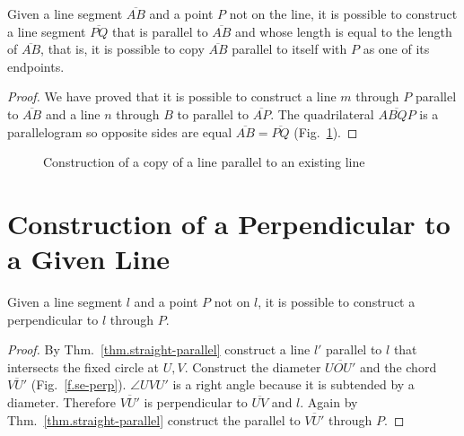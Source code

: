 \begin{theorem}\label{thm.parallel-equal}
Given a line segment $\overline{AB}$ and a point $P$ not on the line, it is possible to construct a line segment $\overline{PQ}$ that is parallel to $\overline{AB}$ and whose length is equal to the length of $\overline{AB}$, that is, it is possible to copy $\overline{AB}$ parallel to itself with $P$ as one of its endpoints.
\end{theorem}

\begin{proof}
We have proved that it is possible to construct a line $m$ through $P$ parallel to $\overline{AB}$ and a line $n$ through $B$ to parallel to $\overline{AP}$. The quadrilateral $\overline{ABQP}$ is a parallelogram so opposite sides are equal $\overline{AB}=\overline{PQ}$ (Fig.~\ref{f.se-parallel-other4}).
\end{proof}

\begin{figure}[t]
\begin{center}
\end{center}
\caption{Construction of  a copy of a line parallel to an existing line}\label{f.se-parallel-other4}
\end{figure}

\section{Construction of a Perpendicular to a Given Line}\label{s.perp}

\begin{theorem}\label{thm.straight-perp}
Given a line segment $l$ and a point $P$ not on $l$, it is possible to construct a perpendicular to $l$ through $P$.
\end{theorem}

\begin{proof}
By Thm.~\ref{thm.straight-parallel} construct a line $l'$ parallel to $l$ that intersects the fixed circle at $U,V$. Construct the diameter $\overline{UOU'}$ and the chord $\overline{VU'}$ (Fig.~\ref{f.se-perp}). $\angle UVU'$ is a right angle because it is subtended by a diameter. Therefore $\overline{VU'}$ is perpendicular to $\overline{UV}$ and $l$. Again by Thm.~\ref{thm.straight-parallel} construct the parallel to $\overline{VU'}$ through $P$.
\end{proof}

